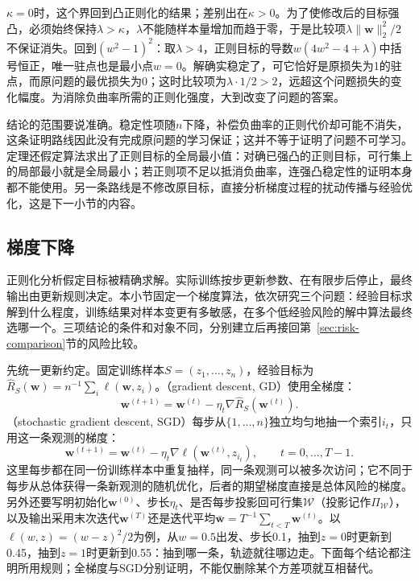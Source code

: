 $\kappa=0$时，这个界回到凸正则化的结果；差别出在$\kappa>0$。为了使修改后的目标强凸，必须始终保持$\lambda>\kappa$，$\lambda$不能随样本量增加而趋于零，于是比较项$\lambda\|\bm w\|_2^2/2$不保证消失。回到$(w^2-1)^2$：取$\lambda>4$，正则目标的导数$w(4w^2-4+\lambda)$中括号恒正，唯一驻点也是最小点$w=0$。解确实稳定了，可它恰好是原损失为1的驻点，而原问题的最优损失为0；这时比较项为$\lambda\cdot1/2>2$，远超这个问题损失的变化幅度。为消除负曲率所需的正则化强度，大到改变了问题的答案。

结论的范围要说准确。稳定性项随$n$下降，补偿负曲率的正则代价却可能不消失，这条证明路线因此没有完成原问题的学习保证；这并不等于证明了问题不可学习。定理还假定算法求出了正则目标的全局最小值：对确已强凸的正则目标，可行集上的局部最小就是全局最小；若正则项不足以抵消负曲率，连强凸稳定性的证明本身都不能使用。另一条路线是不修改原目标，直接分析梯度过程的扰动传播与经验优化，这是下一小节的内容。

\subsection{梯度下降}
\label{sec:gradient-descent-guarantees}

正则化分析假定目标被精确求解。实际训练按步更新参数、在有限步后停止，最终输出由更新规则决定。本小节固定一个梯度算法，依次研究三个问题：经验目标求解到什么程度，训练结果对样本变更有多敏感，在多个低经验风险的解中算法最终选哪一个。三项结论的条件和对象不同，分别建立后再接回第~\ref{sec:risk-comparison}节的风险比较。

先统一更新约定。固定训练样本$S=(z_1,\ldots,z_n)$，经验目标为$\hat R_S(\bm w)=n^{-1}\sum_i\ell(\bm w,z_i)$。（gradient descent, GD）使用全梯度：
\[
 \bm w^{(t+1)}=\bm w^{(t)}-\eta_t\nabla\hat R_S(\bm w^{(t)}).
\]
（stochastic gradient descent, SGD）每步从$\{1,\ldots,n\}$独立均匀地抽一个索引$i_t$，只用这一条观测的梯度：
\begin{equation}
 \bm w^{(t+1)}=\bm w^{(t)}-\eta_t\nabla\ell(\bm w^{(t)},z_{i_t}),
 \qquad t=0,\ldots,T-1.
 \label{eq:sgd-update}
\end{equation}
这里每步都在同一份训练样本中重复抽样，同一条观测可以被多次访问；它不同于每步从总体获得一条新观测的随机优化，后者的期望梯度直接是总体风险的梯度。另外还要写明初始化$\bm w^{(0)}$、步长$\eta_t$、是否每步投影回可行集$\mathcal W$（投影记作$\Pi_{\mathcal W}$），以及输出采用末次迭代$\bm w^{(T)}$还是迭代平均$\bar{\bm w}=T^{-1}\sum_{t<T}\bm w^{(t)}$。以$\ell(w,z)=(w-z)^2/2$为例，从$w=0.5$出发、步长0.1，抽到$z=0$时更新到0.45，抽到$z=1$时更新到0.55：抽到哪一条，轨迹就往哪边走。下面每个结论都注明所用规则；全梯度与SGD分别证明，不能仅删除某个方差项就互相替代。

